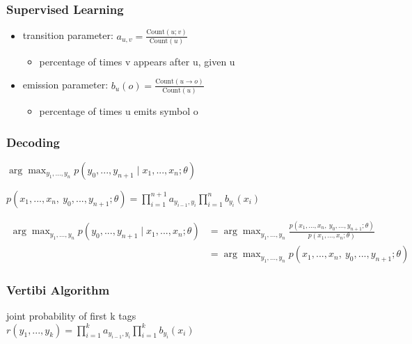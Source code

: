 \documentclass[11pt]{article}
\providecommand{\tightlist}{%
      \setlength{\itemsep}{0pt}\setlength{\parskip}{0pt}}
\begin{document}
\hypertarget{supervised-learning}{%
\subsubsection{Supervised Learning}\label{supervised-learning}}

\begin{itemize}
\tightlist
\item
  transition parameter:
  \(a_{u,v}=\frac{\text{Count}(u;v)}{\text{Count}(u)}\)

  \begin{itemize}
  \tightlist
  \item
    percentage of times v appears after u, given u
  \end{itemize}
\item
  emission parameter:
  \(b_u(o)=\frac{\text{Count}(u\rightarrow o)}{\text{Count}(u)}\)

  \begin{itemize}
  \tightlist
  \item
    percentage of times u emits symbol o
  \end{itemize}
\end{itemize}

\hypertarget{decoding}{%
\subsubsection{Decoding}\label{decoding}}

\(\arg\max_{y_1,...,y_n}p(y_0,...,y_{n+1}\mid x_1,...,x_n;\theta)\)

\(p(x_1,...,x_n,\ y_0,...,y_{n+1};\theta)=\prod_{i=1}^{n+1}a_{y_{i-1},y_i}\prod_{i=1}^nb_{y_i}(x_i)\)

\(\begin{aligned}\arg\max_{y_1,...,y_n}p(y_0,...,y_{n+1}\mid x_1,...,x_n;\theta)&=\arg\max_{y_1,...,y_n}\frac{p(x_1,...,x_n,\ y_0,...,y_{n+1};\theta)}{p(x_1,...,x_n;\theta)}\\&=\arg\max_{y_1,...,y_n}p(x_1,...,x_n,\ y_0,...,y_{n+1};\theta)\end{aligned}\)

\hypertarget{vertibi-algorithm}{%
\subsubsection{Vertibi Algorithm}\label{vertibi-algorithm}}

joint probability of first k tags\\
\(r(y_1,...,y_k)=\prod_{i=1}^{k}a_{y_{i-1},y_i}\prod_{i=1}^kb_{y_i}(x_i)\)
\end{document}
